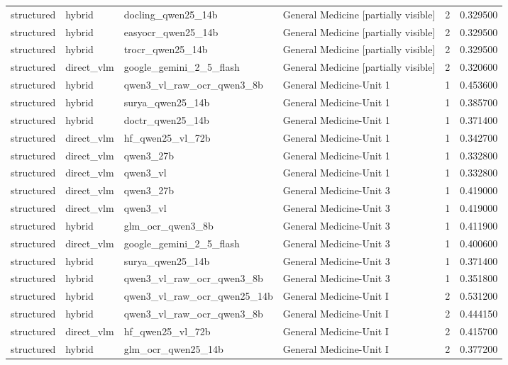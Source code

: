 \begin{tabular}{llllrr}
structured & hybrid & docling\_qwen25\_14b & General Medicine [partially visible] & 2 & 0.329500 \\
structured & hybrid & easyocr\_qwen25\_14b & General Medicine [partially visible] & 2 & 0.329500 \\
structured & hybrid & trocr\_qwen25\_14b & General Medicine [partially visible] & 2 & 0.329500 \\
structured & direct\_vlm & google\_gemini\_2\_5\_flash & General Medicine [partially visible] & 2 & 0.320600 \\
structured & hybrid & qwen3\_vl\_raw\_ocr\_qwen3\_8b & General Medicine-Unit 1 & 1 & 0.453600 \\
structured & hybrid & surya\_qwen25\_14b & General Medicine-Unit 1 & 1 & 0.385700 \\
structured & hybrid & doctr\_qwen25\_14b & General Medicine-Unit 1 & 1 & 0.371400 \\
structured & direct\_vlm & hf\_qwen25\_vl\_72b & General Medicine-Unit 1 & 1 & 0.342700 \\
structured & direct\_vlm & qwen3\_27b & General Medicine-Unit 1 & 1 & 0.332800 \\
structured & direct\_vlm & qwen3\_vl & General Medicine-Unit 1 & 1 & 0.332800 \\
structured & direct\_vlm & qwen3\_27b & General Medicine-Unit 3 & 1 & 0.419000 \\
structured & direct\_vlm & qwen3\_vl & General Medicine-Unit 3 & 1 & 0.419000 \\
structured & hybrid & glm\_ocr\_qwen3\_8b & General Medicine-Unit 3 & 1 & 0.411900 \\
structured & direct\_vlm & google\_gemini\_2\_5\_flash & General Medicine-Unit 3 & 1 & 0.400600 \\
structured & hybrid & surya\_qwen25\_14b & General Medicine-Unit 3 & 1 & 0.371400 \\
structured & hybrid & qwen3\_vl\_raw\_ocr\_qwen3\_8b & General Medicine-Unit 3 & 1 & 0.351800 \\
structured & hybrid & qwen3\_vl\_raw\_ocr\_qwen25\_14b & General Medicine-Unit I & 2 & 0.531200 \\
structured & hybrid & qwen3\_vl\_raw\_ocr\_qwen3\_8b & General Medicine-Unit I & 2 & 0.444150 \\
structured & direct\_vlm & hf\_qwen25\_vl\_72b & General Medicine-Unit I & 2 & 0.415700 \\
structured & hybrid & glm\_ocr\_qwen25\_14b & General Medicine-Unit I & 2 & 0.377200 \\

\end{tabular}
